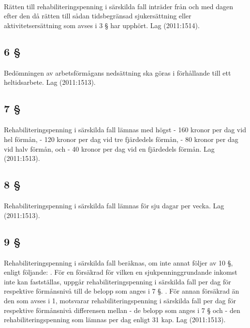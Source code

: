 \documentclass[a4paper,notitlepage,openany,10pt]{book}
\begin{document}
\paragraph*{}
Rätten till rehabiliteringspenning i särskilda fall inträder från och med dagen efter den då rätten till sådan tidsbegränsad sjukersättning eller aktivitetsersättning som avses i 3 § har upphört.
Lag (2011:1514).
\subsection*{6 §}
\paragraph*{}
Bedömningen av arbetsförmågans nedsättning ska göras i förhållande till ett heltidsarbete.
Lag (2011:1513).
\subsection*{7 §}
\paragraph*{}
Rehabiliteringspenning i särskilda fall lämnas med högst
\newline - 160 kronor per dag vid hel förmån,
\newline - 120 kronor per dag vid tre fjärdedels förmån,
\newline - 80 kronor per dag vid halv förmån, och
\newline - 40 kronor per dag vid en fjärdedels förmån.
Lag (2011:1513).
\subsection*{8 §}
\paragraph*{}
Rehabiliteringspenning i särskilda fall lämnas för sju dagar per vecka.
Lag (2011:1513).
\subsection*{9 §}
\paragraph*{}
Rehabiliteringspenning i särskilda fall beräknas, om inte annat följer av 10 §, enligt följande:
. För en försäkrad för vilken en sjukpenninggrundande inkomst inte kan fastställas, uppgår rehabiliteringspenning i särskilda fall per dag för respektive förmånsnivå till de belopp som anges i 7 §.
. För annan försäkrad än den som avses i 1, motsvarar rehabiliteringspenning i särskilda fall per dag för respektive förmånsnivå differensen mellan
\newline - de belopp som anges i 7 § och
\newline - den rehabiliteringspenning som lämnas per dag enligt 31 kap.
Lag (2011:1513).
\end{document}
